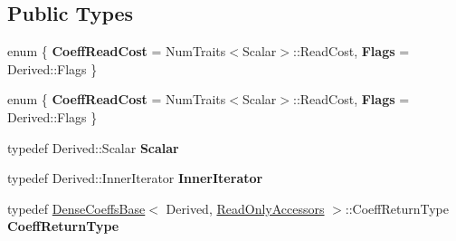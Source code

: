 \subsection*{Public Types}
\begin{DoxyCompactItemize}
\item 
\mbox{\label{struct_eigen_1_1internal_1_1evaluator_3_01_sparse_compressed_base_3_01_derived_01_4_01_4_a3b29c51dfecf2b38e29c7e8af56ebd72}} 
enum \{ {\bfseries Coeff\+Read\+Cost} = Num\+Traits$<$Scalar$>$\+:\+:Read\+Cost, 
{\bfseries Flags} = Derived\+:\+:Flags
 \}
\item 
\mbox{\label{struct_eigen_1_1internal_1_1evaluator_3_01_sparse_compressed_base_3_01_derived_01_4_01_4_aa172c7022bee3faeaaf24491d1e655fd}} 
enum \{ {\bfseries Coeff\+Read\+Cost} = Num\+Traits$<$Scalar$>$\+:\+:Read\+Cost, 
{\bfseries Flags} = Derived\+:\+:Flags
 \}
\item 
\mbox{\label{struct_eigen_1_1internal_1_1evaluator_3_01_sparse_compressed_base_3_01_derived_01_4_01_4_a0ee9c4e4302545da033cb6574a92b0c5}} 
typedef Derived\+::\+Scalar {\bfseries Scalar}
\item 
\mbox{\label{struct_eigen_1_1internal_1_1evaluator_3_01_sparse_compressed_base_3_01_derived_01_4_01_4_abc5d24ea2cacb1f9fa79e7e936e70816}} 
typedef Derived\+::\+Inner\+Iterator {\bfseries Inner\+Iterator}
\item 
\mbox{\label{struct_eigen_1_1internal_1_1evaluator_3_01_sparse_compressed_base_3_01_derived_01_4_01_4_a6a09f2251fbe97b764aedfe9a05a19d7}} 
typedef \hyperlink{class_eigen_1_1_dense_coeffs_base}{Dense\+Coeffs\+Base}$<$ Derived, \hyperlink{group__enums_gga9f93eac38eb83deb0e8dbd42ddf11d5da42865f87356ad7e585a1bfbfd1b81699}{Read\+Only\+Accessors} $>$\+::Coeff\+Return\+Type {\bfseries Coeff\+Return\+Type}
\item 
\mbox{\label{struct_eigen_1_1internal_1_1evaluator_3_01_sparse_compressed_base_3_01_derived_01_4_01_4_a0ee9c4e4302545da033cb6574a92b0c5}} 

\end{DoxyCompactItemize}
